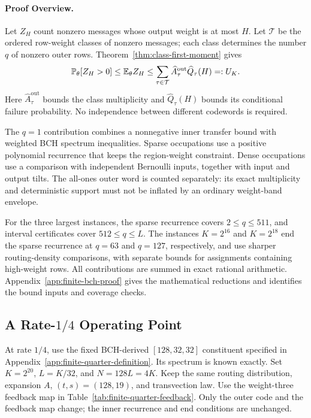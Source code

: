 \paragraph{Proof Overview.}
Let $Z_H$ count nonzero messages whose output weight is at most $H$.
Let $\mathcal T$ be the ordered row-weight classes of nonzero messages;
each class determines the number $q$ of nonzero outer rows.
Theorem~\ref{thm:class-first-moment} gives
\begin{equation}
  \mathbb P_\theta[Z_H>0]\le\mathbb E_\theta Z_H
  \le\sum_{\tau\in\mathcal T}
      \widehat A_\tau^{\mathrm{out}}\widehat Q_\tau(H)
  =:U_K.
  \label{eq:finite-certificate}
\end{equation}
Here $\widehat A_\tau^{\mathrm{out}}$ bounds the class multiplicity and
$\widehat Q_\tau(H)$ bounds its conditional failure probability.
No independence between different codewords is required.

The $q=1$ contribution combines a nonnegative inner transfer bound with
weighted BCH spectrum inequalities. Sparse occupations use a positive
polynomial recurrence that keeps the region-weight constraint. Dense
occupations use a comparison with independent Bernoulli inputs, together
with input and output tilts. The all-ones outer word is counted separately:
its exact multiplicity and deterministic support must not be inflated by an
ordinary weight-band envelope.

For the three largest instances, the sparse recurrence covers $2\le q\le511$,
and interval certificates cover $512\le q\le L$. The instances
$K=2^{16}$ and $K=2^{18}$ end the sparse recurrence at $q=63$ and $q=127$,
respectively, and use sharper routing-density comparisons, with separate bounds for
assignments containing high-weight rows. All contributions are summed in
exact rational arithmetic. Appendix~\ref{app:finite-bch-proof}
gives the mathematical reductions and identifies the bound inputs and
coverage checks.

\subsection{A Rate-$1/4$ Operating Point}
\label{sec:finite-quarter}

At rate $1/4$, use the fixed BCH-derived $[128,32,32]$ constituent specified
in Appendix~\ref{app:finite-quarter-definition}. Its spectrum is known
exactly. Set $K=2^{20}$, $L=K/32$, and $N=128L=4K$. Keep the same
routing distribution, expansion $A$, $(t,s)=(128,19)$, and transvection
law. Use the weight-three feedback map in
Table~\ref{tab:finite-quarter-feedback}. Only the outer code and the
feedback map change; the inner recurrence and end conditions are unchanged.

